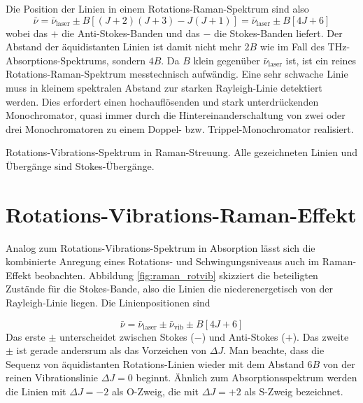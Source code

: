 Die Position der Linien in einem Rotations-Raman-Spektrum sind also
\begin{equation}
 \bar{\nu} =  \bar{\nu}_\text{laser} \pm B \left[ (J+2) (J+3) - J(J+1) \right] = 
 \bar{\nu}_\text{laser} \pm B \left[ 4J + 6 \right]
\end{equation}
wobei das $+$ die Anti-Stokes-Banden und das $-$ die Stokes-Banden liefert. Der Abstand der äquidistanten Linien ist damit nicht mehr $2B$ wie im Fall des THz-Absorptions-Spektrums, sondern $4B$. Da $B$ klein gegenüber $\bar{\nu}_\text{laser} $ ist, ist ein reines Rotations-Raman-Spektrum messtechnisch aufwändig. Eine sehr schwache Linie muss in kleinem spektralen Abstand zur starken Rayleigh-Linie detektiert werden. Dies erfordert einen hochauflösenden und stark unterdrückenden Monochromator, quasi immer durch die Hintereinanderschaltung von zwei oder drei Monochromatoren zu einem Doppel- bzw. Trippel-Monochromator realisiert.




\begin{marginfigure}
\caption{Rotations-Vibrations-Spektrum in Raman-Streuung. Alle gezeichneten Linien und Übergänge sind Stokes-Übergänge.  \label{fig:raman_rotvib}}
\end{marginfigure}

 \section{Rotations-Vibrations-Raman-Effekt}

Analog zum Rotations-Vibrations-Spektrum in Absorption lässt sich die kombinierte Anregung eines Rotations- und Schwingungsniveaus auch im Raman-Effekt beobachten. Abbildung \ref{fig:raman_rotvib} skizziert die beteiligten Zustände für die Stokes-Bande, also die Linien die niederenergetisch von der Rayleigh-Linie liegen. Die Linienpositionen sind 

\begin{equation}
 \bar{\nu} =  \bar{\nu}_\text{laser} \pm \bar{\nu}_\text{vib} \pm B \left[ 4J + 6 \right] 
\end{equation}
Das erste $\pm$ unterscheidet zwischen Stokes ($-$) und Anti-Stokes ($+$). Das zweite $\pm$ ist gerade andersrum als das Vorzeichen von $\Delta J$. Man beachte, dass die Sequenz von äquidistanten Rotations-Linien wieder mit dem Abstand $6B$ von der reinen Vibrationslinie  $\Delta J = 0$ beginnt. Ähnlich zum Absorptionsspektrum werden die Linien mit $\Delta J =-2$ als O-Zweig, die mit 
$\Delta J =+2$ als S-Zweig bezeichnet.




